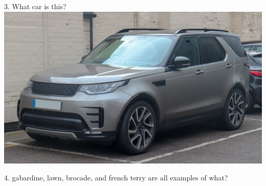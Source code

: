 \begin{frame}
\begin{center}
\Large
3. What car is this?
\\
\vspace{0.5em}\includegraphics[height=0.6\paperheight]{images/land_rover_discovery.jpg}
\\
\end{center}
\end{frame}
\begin{frame}
\begin{center}
\Large
4. gabardine, lawn, brocade, and french terry are all examples of what?
\\
\\
\end{center}
\end{frame}
